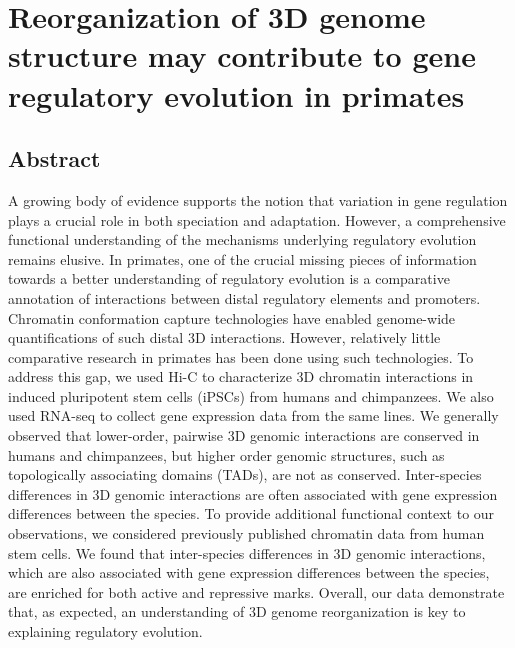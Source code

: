 \chapter{Reorganization of 3D genome structure may contribute to gene regulatory evolution in primates}\label{ch:ch02}

\section[Abstract]{Abstract\footnotemark}


A growing body of evidence supports the notion that variation in gene regulation plays a crucial role in both speciation and adaptation. However, a comprehensive functional understanding of the mechanisms underlying regulatory evolution remains elusive. In primates, one of the crucial missing pieces of information towards a better understanding of regulatory evolution is a comparative annotation of interactions between distal regulatory elements and promoters. Chromatin conformation capture technologies have enabled genome-wide quantifications of such distal 3D interactions. However, relatively little comparative research in primates has been done using such technologies. To address this gap, we used Hi-C to characterize 3D chromatin interactions in induced pluripotent stem cells (iPSCs) from humans and chimpanzees. We also used RNA-seq to collect gene expression data from the same lines. We generally observed that lower-order, pairwise 3D genomic interactions are conserved in humans and chimpanzees, but higher order genomic structures, such as topologically associating domains (TADs), are not as conserved. Inter-species differences in 3D genomic interactions are often associated with gene expression differences between the species. To provide additional functional context to our observations, we considered previously published chromatin data from human stem cells. We found that inter-species differences in 3D genomic interactions, which are also associated with gene expression differences between the species, are enriched for both active and repressive marks. Overall, our data demonstrate that, as expected, an understanding of 3D genome reorganization is key to explaining regulatory evolution.

